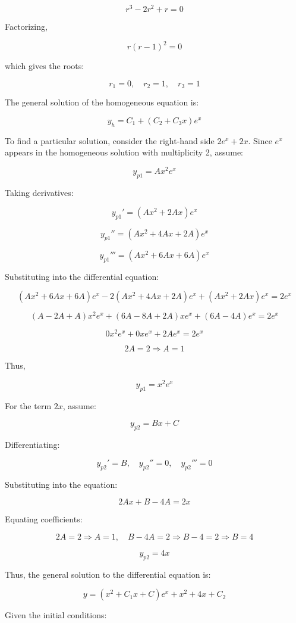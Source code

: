 \documentclass[12pt]{article}
\begin{document}
\begin{enumerate}
\[
r^3 - 2r^2 + r = 0
\]

Factorizing,

\[
r (r - 1)^2 = 0
\]

which gives the roots:

\[
r_1 = 0, \quad r_2 = 1, \quad r_3 = 1
\]

The general solution of the homogeneous equation is:

\[
y_h = C_1 + (C_2 + C_3 x) e^x
\]

To find a particular solution, consider the right-hand side \( 2e^x + 2x \). Since \( e^x \) appears in the homogeneous solution with multiplicity 2, assume:

\[
y_{p1} = A x^2 e^x
\]

Taking derivatives:

\[
y_{p1}' = (A x^2 + 2A x) e^x
\]

\[
y_{p1}'' = (A x^2 + 4A x + 2A) e^x
\]

\[
y_{p1}''' = (A x^2 + 6A x + 6A) e^x
\]

Substituting into the differential equation:

\[
(A x^2 + 6A x + 6A) e^x - 2(A x^2 + 4A x + 2A) e^x + (A x^2 + 2A x) e^x = 2 e^x
\]

\[
(A - 2A + A) x^2 e^x + (6A - 8A + 2A) x e^x + (6A - 4A) e^x = 2 e^x
\]

\[
0 x^2 e^x + 0 x e^x + 2A e^x = 2 e^x
\]

\[
2A = 2 \Rightarrow A = 1
\]

Thus,

\[
y_{p1} = x^2 e^x
\]

For the term \( 2x \), assume:

\[
y_{p2} = B x + C
\]

Differentiating:

\[
y_{p2}' = B, \quad y_{p2}'' = 0, \quad y_{p2}''' = 0
\]

Substituting into the equation:

\[
2Ax + B - 4A = 2x
\]

Equating coefficients:

\[
2A = 2 \Rightarrow A = 1, \quad B - 4A = 2 \Rightarrow B - 4 = 2 \Rightarrow B = 4
\]

\[
y_{p2} = 4x
\]

Thus, the general solution to the differential equation is:

\[
y = (x^2 + C_1 x + C) e^x + x^2 + 4x + C_2
\]

Given the initial conditions:


\end{enumerate}
\end{document}
